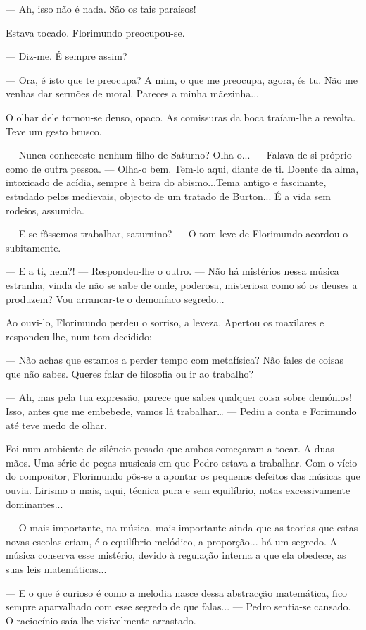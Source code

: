 --- Ah, isso não é nada. São os tais paraísos!

Estava tocado. Florimundo preocupou-se.

--- Diz-me. É sempre assim?

--- Ora, é isto que te preocupa? A mim, o que me preocupa, agora, és tu.
Não me venhas dar sermões de moral. Pareces a minha mãezinha...

O olhar dele tornou-se denso, opaco. As comissuras da boca traíam-lhe a
revolta. Teve um gesto brusco.

--- Nunca conheceste nenhum filho de Saturno? Olha-o... --- Falava de si
próprio como de outra pessoa. --- Olha-o bem. Tem-lo aqui, diante de ti.
Doente da alma, intoxicado de acídia, sempre à beira do abismo...Tema
antigo e fascinante, estudado pelos medievais, objecto de um tratado de
Burton... É a vida sem rodeios, assumida.

--- E se fôssemos trabalhar, saturnino? --- O tom leve de Florimundo
acordou-o subitamente.

--- E a ti, hem?! --- Respondeu-lhe o outro. --- Não há mistérios nessa música
estranha, vinda de não se sabe de onde, poderosa, misteriosa como só os
deuses a produzem? Vou arrancar-te o demoníaco segredo...

Ao ouvi-lo, Florimundo perdeu o sorriso, a leveza. Apertou os maxilares
e respondeu-lhe, num tom decidido:

--- Não achas que estamos a perder tempo com metafísica? Não fales de
coisas que não sabes. Queres falar de filosofia ou ir ao trabalho?

--- Ah, mas pela tua expressão, parece que sabes qualquer coisa sobre
demónios! Isso, antes que me embebede, vamos lá trabalhar\ldots{} ---
Pediu a conta e Forimundo até teve medo de olhar.

Foi num ambiente de silêncio pesado que ambos começaram a tocar. A duas
mãos. Uma série de peças musicais em que Pedro estava a trabalhar. Com o
vício do compositor, Florimundo pôs-se a apontar os pequenos defeitos
das músicas que ouvia. Lirismo a mais, aqui, técnica pura e sem
equilíbrio, notas excessivamente dominantes...

--- O mais importante, na música, mais importante ainda que as teorias que
estas novas escolas criam, é o equilíbrio melódico, a proporção... há um
segredo. A música conserva esse mistério, devido à regulação interna a
que ela obedece, as suas leis matemáticas...

--- E o que é curioso é como a melodia nasce dessa abstracção matemática,
fico sempre aparvalhado com esse segredo de que falas... --- Pedro
sentia-se cansado. O raciocínio saía-lhe visivelmente arrastado.

